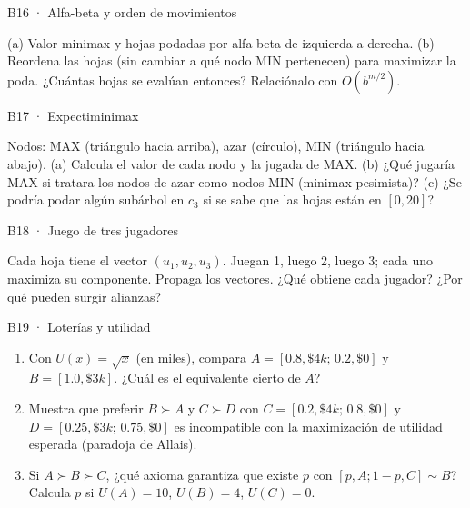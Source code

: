 \begin{ejercicio}{B16 · Alfa-beta y orden de movimientos }
\begin{center}\figTDos\end{center}
(a) Valor minimax y hojas podadas por alfa-beta de izquierda a derecha.
(b) Reordena las hojas (sin cambiar a qué nodo MIN pertenecen) para maximizar la poda.
¿Cuántas hojas se evalúan entonces? Relaciónalo con $O(b^{m/2})$.
\end{ejercicio}

\begin{ejercicio}{B17 · Expectiminimax }
\begin{center}\figExp\end{center}
Nodos: MAX (triángulo hacia arriba), azar (círculo), MIN (triángulo hacia abajo).
(a) Calcula el valor de cada nodo y la jugada de MAX.
(b) ¿Qué jugaría MAX si tratara los nodos de azar como nodos MIN (minimax pesimista)?
(c) ¿Se podría podar algún subárbol en $c_3$ si se sabe que las hojas están en $[0,20]$?
\end{ejercicio}

\begin{ejercicio}{B18 · Juego de tres jugadores }
\begin{center}\figMaxN\end{center}
Cada hoja tiene el vector $(u_1,u_2,u_3)$. Juegan 1, luego 2, luego 3; cada uno maximiza su
componente. Propaga los vectores. ¿Qué obtiene cada jugador? ¿Por qué pueden surgir alianzas?
\end{ejercicio}

\begin{ejercicio}{B19 · Loterías y utilidad }
\begin{enumerate}[label=(\alph*)]
\item Con $U(x)=\sqrt{x}$ (en miles), compara $A=[0.8,\$4k;\,0.2,\$0]$ y $B=[1.0,\$3k]$. ¿Cuál es el
equivalente cierto de $A$?
\item Muestra que preferir $B\succ A$ y $C\succ D$ con $C=[0.2,\$4k;\,0.8,\$0]$ y $D=[0.25,\$3k;\,0.75,\$0]$
es incompatible con la maximización de utilidad esperada (paradoja de Allais).
\item Si $A\succ B\succ C$, ¿qué axioma garantiza que existe $p$ con $[p,A;1-p,C]\sim B$? Calcula $p$ si
$U(A)=10$, $U(B)=4$, $U(C)=0$.
\end{enumerate}
\end{ejercicio}

